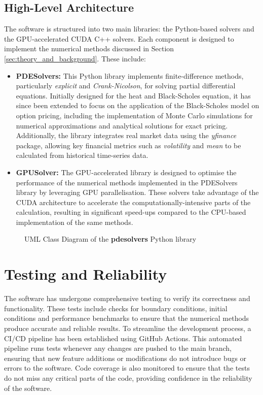 \subsection{High-Level Architecture}
The software is structured into two main libraries: the Python-based solvers and the GPU-accelerated CUDA C++ solvers. Each component is designed to implement the numerical methods discussed in Section \ref{sec:theory_and_background}. These include:
\begin{itemize}
    \item \textbf{PDESolvers:} This Python library implements finite-difference methods, particularly \textit{explicit} and \textit{Crank-Nicolson}, for solving partial differential equations. Initially designed for the heat and Black-Scholes equation, it has since been extended to focus on the application of the Black-Scholes model on option pricing, including the implementation of Monte Carlo simulations for numerical approximations and analytical solutions for exact pricing. Additionally, the library integrates real market data using the \textit{yfinance} package, allowing key financial metrics such as \textit{volatility} and \textit{mean} to be calculated from historical time-series data. 
    \item \textbf{GPUSolver:} The GPU-accelerated library is designed to optimise the performance of the numerical methods implemented in the PDESolvers library by leveraging GPU parallelisation. These solvers take advantage of the CUDA architecture to accelerate the computationally-intensive parts of the calculation, resulting in significant speed-ups compared to the CPU-based implementation of the same methods.
\end{itemize}


\clearpage 
\begin{landscape}
    \begin{figure}[H]
        \centering
        
        \caption{UML Class Diagram of the \textbf{pdesolvers} Python library}
        \label{fig:uml_class}
    \end{figure}
\end{landscape}
\clearpage

\section{Testing and Reliability} \label{sec:software_testing}
The software has undergone comprehensive testing to verify its correctness and functionality. These tests include checks for boundary conditions, initial conditions and performance benchmarks to ensure that the numerical methods produce accurate and reliable results. To streamline the development process, a CI/CD pipeline has been established using GitHub Actions. This automated pipeline runs tests whenever any changes are pushed to the main branch, ensuring that new feature additions or modifications do not introduce bugs or errors to the software. Code coverage is also monitored to ensure that the tests do not miss any critical parts of the code, providing confidence in the reliability of the software.

